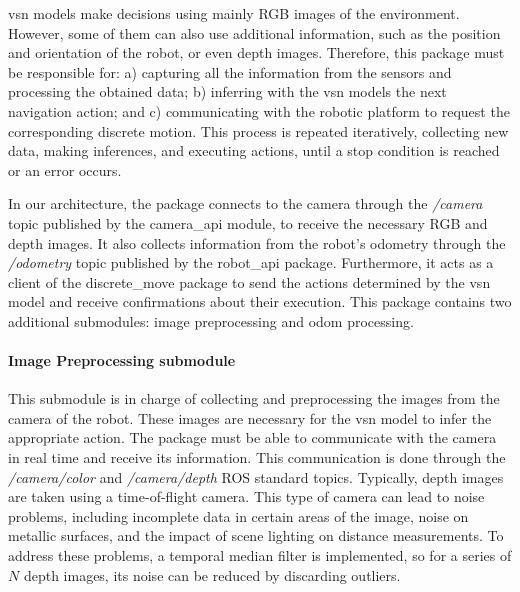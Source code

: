 \acrshort{vsn} models make decisions using mainly RGB images of the environment.
However, some of them can also use additional information, such as the position and orientation of the robot, or even depth images.
Therefore, this package must be responsible for: a) capturing all the information from the sensors and processing the obtained data; b) inferring with the \acrshort{vsn} models the next navigation action; and c) communicating with the robotic platform to request the corresponding discrete motion.
This process is repeated iteratively, collecting new data, making inferences, and executing actions, until a stop condition is reached or an error occurs.

In our architecture, the package connects to the camera through the \textit{/camera} topic published by the camera\_api module, to receive the necessary RGB and depth images.
It also collects information from the robot's odometry through the \textit{/odometry} topic published by the robot\_api package.
Furthermore, it acts as a client of the discrete\_move package to send the actions determined by the \acrshort{vsn} model and receive confirmations about their execution.
This package contains two additional submodules: image preprocessing and odom processing.




\paragraph*{Image Preprocessing submodule}\label{par:image-preprocessing}

This submodule is in charge of collecting and preprocessing the images from the camera of the robot.
These images are necessary for the \acrshort{vsn} model to infer the appropriate action.
The package must be able to communicate with the camera in real time and receive its information.
This communication is done through the \textit{/camera/color} and \textit{/camera/depth} ROS standard topics.
Typically, depth images are taken using a time-of-flight camera.
This type of camera can lead to noise problems, including incomplete data in certain areas of the image, noise on metallic surfaces, and the impact of scene lighting on distance measurements.
To address these problems, a temporal median filter is implemented, so for a series of $N$ depth images, its noise can be reduced by discarding outliers.

